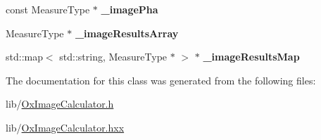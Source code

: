 \begin{DoxyCompactItemize}
\item 
const Measure\+Type $\ast$ {\bfseries \+\_\+image\+Pha}\hypertarget{class_ox_1_1_image_calculator_a39a6effe2e303382810b19f00bb36b72}{}\label{class_ox_1_1_image_calculator_a39a6effe2e303382810b19f00bb36b72}

\item 
Measure\+Type $\ast$ {\bfseries \+\_\+image\+Results\+Array}\hypertarget{class_ox_1_1_image_calculator_a59095ed485d176b6a8628a5e34aaa160}{}\label{class_ox_1_1_image_calculator_a59095ed485d176b6a8628a5e34aaa160}

\item 
std\+::map$<$ std\+::string, Measure\+Type $\ast$ $>$ $\ast$ {\bfseries \+\_\+image\+Results\+Map}\hypertarget{class_ox_1_1_image_calculator_a2e3a18d0aec38e2625b5873a0db54c28}{}\label{class_ox_1_1_image_calculator_a2e3a18d0aec38e2625b5873a0db54c28}

\end{DoxyCompactItemize}


The documentation for this class was generated from the following files\+:\begin{DoxyCompactItemize}
\item 
lib/\hyperlink{_ox_image_calculator_8h}{Ox\+Image\+Calculator.\+h}\item 
lib/\hyperlink{_ox_image_calculator_8hxx}{Ox\+Image\+Calculator.\+hxx}\end{DoxyCompactItemize}
